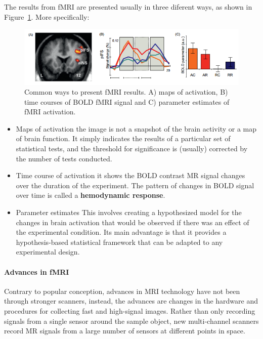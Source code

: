 \documentclass[12pt,article,oneside,a4paper]{memoir}
\begin{document}
The results from fMRI are presented usually in three diferent ways, as shown in
Figure~\ref{fig:fMRI-results}. More specifically:
\begin{figure}
  \centering
  \includegraphics[width=\textwidth]{imgs/fMRI-results.png}
  \caption{Common ways to present fMRI results. A) maps of activation, B) time
  courses of BOLD fMRI signal and C) parameter estimates of fMRI activation.}
  \label{fig:fMRI-results}
\end{figure}

\begin{itemize}
\item Maps of activation
\subitem the image is not a snapshot of the brain activity or a map of brain
function.
It simply indicates the results of a particular set of statistical tests, and
the threshold for significance is (usually) corrected by the number of tests
conducted.
\item Time course of activation
\subitem it shows the BOLD contrast MR signal changes over the duration of the
experiment. The pattern of changes in BOLD signal over time is called a
\textbf{hemodynamic response}.
\item Parameter estimates
\subitem This involves creating a hypothesized model for the changes in brain
activation that would be observed if there was an effect of the experimental
condition. Its main advantage is that it provides a hypothesis-based
statistical framework that can be adapted to any experimental design.
\end{itemize}

\paragraph{Advances in fMRI}
Contrary to popular conception, advances in MRI technology have not been
through stronger scanners, instead, the advances are changes in the hardware
and procedures for collecting fast and high-signal images. Rather than only
recording signals from a single sensor around the sample object, new
multi-channel scanners record MR signals from a large number of sensors at
different points in space.
\end{document}
